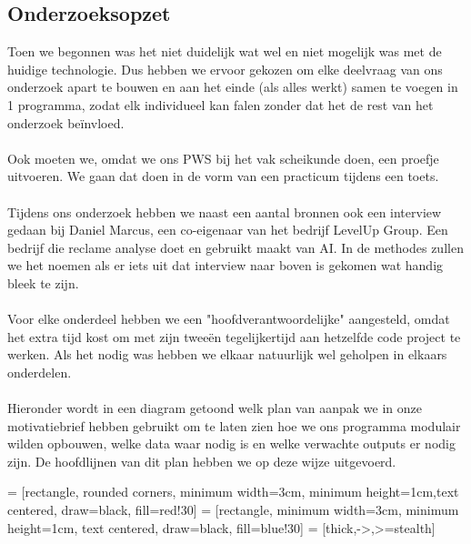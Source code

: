 \documentclass[12pt]{article}
\begin{document}
\subsection{Onderzoeksopzet}
\begin{multicols}{2}
Toen we begonnen was het niet duidelijk wat wel en niet mogelijk was met de huidige technologie. Dus hebben we ervoor gekozen om elke deelvraag van ons onderzoek apart te bouwen en aan het einde (als alles werkt) samen te voegen in 1 programma, zodat elk individueel kan falen zonder dat het de rest van het onderzoek beïnvloed.
\\\\
Ook moeten we, omdat we ons PWS bij het vak scheikunde doen, een proefje uitvoeren. We gaan dat doen in de vorm van een practicum tijdens een toets.
\\\\
Tijdens ons onderzoek hebben we naast een aantal bronnen ook een interview gedaan bij Daniel Marcus, een co-eigenaar van het bedrijf LevelUp Group. Een bedrijf die reclame analyse doet en gebruikt maakt van AI. In de methodes zullen we het noemen als er iets uit dat interview naar boven is gekomen wat handig bleek te zijn.
\\\\
Voor elke onderdeel hebben we een "hoofdverantwoordelijke" aangesteld, omdat het extra tijd kost om met zijn tweeën tegelijkertijd aan hetzelfde code project te werken. Als het nodig was hebben we elkaar natuurlijk wel geholpen in elkaars onderdelen. 
\\\\
Hieronder wordt in een diagram getoond welk plan van aanpak we in onze motivatiebrief hebben gebruikt om te laten zien hoe we ons programma modulair wilden opbouwen, welke data waar nodig is en welke verwachte outputs er nodig zijn. De hoofdlijnen van dit plan hebben we op deze wijze uitgevoerd.
\end{multicols}

 = [rectangle, rounded corners, minimum width=3cm, minimum height=1cm,text centered, draw=black, fill=red!30]
 = [rectangle, minimum width=3cm, minimum height=1cm, text centered, draw=black, fill=blue!30]
 = [thick,->,>=stealth]

% 
\end{document}
